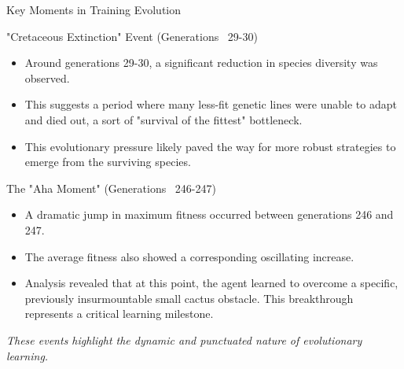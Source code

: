 \documentclass{beamer}
\begin{document}
\begin{frame}{Key Moments in Training Evolution}
    \begin{block}{"Cretaceous Extinction" Event (Generations ~29-30)}
        \begin{itemize}
            \item Around generations 29-30, a significant reduction in species diversity was observed.
            \item This suggests a period where many less-fit genetic lines were unable to adapt and died out, a sort of "survival of the fittest" bottleneck.
            \item This evolutionary pressure likely paved the way for more robust strategies to emerge from the surviving species.
        \end{itemize}
    \end{block}
    \pause
    \begin{block}{The "Aha Moment" (Generations ~246-247)}
        \begin{itemize}
            \item A dramatic jump in maximum fitness occurred between generations 246 and 247.
            \item The average fitness also showed a corresponding oscillating increase.
            \item Analysis revealed that at this point, the agent learned to overcome a specific, previously insurmountable small cactus obstacle. This breakthrough represents a critical learning milestone.
        \end{itemize}
    \end{block}
    \tiny \textit{These events highlight the dynamic and punctuated nature of evolutionary learning.}
\end{frame}
\end{document}
